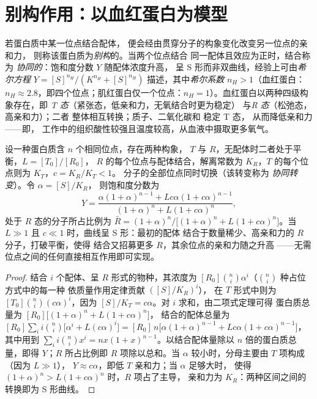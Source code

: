 \section{别构作用：以血红蛋白为模型}

\begin{definition}[别构作用与协同性]\label{def:b3:structural-biology:allostery}
若蛋白质中某一位点结合配体，
便会经由贯穿分子的构象变化改变另一位点的亲和力，
则称该蛋白质为\emph{别构}的。当两个位点结合
同一配体且效应为正时，结合称为
\emph{协同的}：饱和度分数 $Y$ 随配体浓度升高，
呈 S 形而非双曲线，经验上可由\emph{希尔方程}
$Y = [S]^{n_{H}}/(K^{n_{H}} +
[S]^{n_{H}})$ 描述，其中\emph{希尔系数} $n_{H} > 1$（血红蛋白：
$n_{H} \approx 2.8$，即四个位点；肌红蛋白仅一个位点：$n_{H} =
1$）。血红蛋白以两种四级构象存在，即
\emph{T 态}（紧张态，低亲和力，无氧结合时更为稳定）
与\emph{R 态}（松弛态，高亲和力）；二者
整体相互转换；质子、二氧化碳和 稳定 T 态，
从而降低亲和力——即，
工作中的组织酸性较强且温度较高，从血液中摄取更多氧气。
\end{definition}

\begin{theorem}[莫诺–怀曼–尚热模型]\label{thm:b3:structural-biology:mwc}
设一种蛋白质含 $n$ 个相同位点，存在两种构象，
$T$ 与 $R$，无配体时二者处于平衡，$L = [T_{0}]/[R_{0}]$，
$R$ 的每个位点与配体结合，解离常数为
$K_{R}$，$T$ 的每个位点则为 $K_{T}$，$c = K_{R}/K_{T} < 1$。
分子的全部位点同时切换（该转变称为
\emph{协同转变}）。令 $\alpha = [S]/K_{R}$，
则饱和度分数为
\[
Y = \frac{\alpha(1+\alpha)^{n-1} + Lc\alpha(1+c\alpha)^{n-1}}
{(1+\alpha)^{n} + L(1+c\alpha)^{n}},
\]
处于 $R$ 态的分子所占比例为 $\bar R =
(1+\alpha)^{n}/\bigl[(1+\alpha)^{n} + L(1+c\alpha)^{n}\bigr]$。当 $L
\gg 1$ 且 $c \ll 1$ 时，曲线呈 S 形：最初的配体
结合于数量稀少、高亲和力的 $R$ 分子，打破平衡，使得
结合又招募更多 $R$，其余位点的亲和力随之升高
——无需位点之间的任何直接相互作用即可实现。
\end{theorem}
\begin{proof}
结合 $i$ 个配体、呈 $R$ 形式的物种，其浓度为
$[R_{0}]\binom{n}{i}\alpha^{i}$（$\binom{n}{i}$ 种占位方式中的每一种
依质量作用定律贡献 $([S]/K_{R})^{i}$），
在 $T$ 形式中则为 $[T_{0}]\binom{n}{i}(c\alpha)^{i}$，因为
$[S]/K_{T} = c\alpha$。对 $i$ 求和，由二项式定理可得
蛋白质总量为 $[R_{0}]\bigl[(1+\alpha)^{n} + L(1+c\alpha)^{n}\bigr]$，
结合的配体总量为 $[R_{0}]\sum_{i} i\binom{n}{i}\bigl[
\alpha^{i} + L(c\alpha)^{i}\bigr] = [R_{0}]\,n\bigl[\alpha(1+\alpha)^{n-1}
+ Lc\alpha(1+c\alpha)^{n-1}\bigr]$，其中用到 $\sum_{i} i\binom{n}{i}x^{i} =
nx(1+x)^{n-1}$。以结合配体量除以 $n$ 倍的蛋白质总量，即得
$Y$；$R$ 所占比例即 $R$ 项除以总和。当 $\alpha$
较小时，分母主要由 $T$ 项构成（因为 $L \gg 1$），
$Y \approx c\alpha$，即低 $T$ 亲和力；当 $\alpha$ 足够大时，
使得 $(1+\alpha)^{n} > L(1+c\alpha)^{n}$ 时，$R$ 项占了主导，
亲和力为 $K_{R}$：两种区间之间的转换即为 S 形曲线。
\end{proof}

